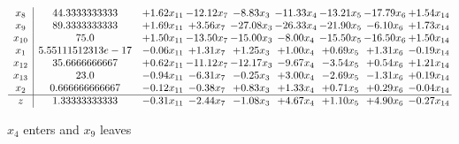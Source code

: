 \documentclass[9pt]{article}
\begin{document}
 \[\begin{array}{c| c c@{\hskip 2pt} c@{\hskip 2pt} c@{\hskip 2pt} c@{\hskip 2pt} c@{\hskip 2pt} c@{\hskip 2pt} c@{\hskip 2pt} }
 x_{8}   &  44.3333333333 & +  1.62 x_{11} & -12.12 x_{7} & -8.83 x_{3} & -11.33 x_{4} & -13.21 x_{5} & -17.79 x_{6} & +  1.54 x_{14}\\
 x_{9}   &  89.3333333333 & +  1.69 x_{11} & +  3.56 x_{7} & -27.08 x_{3} & -26.33 x_{4} & -21.90 x_{5} & -6.10 x_{6} & +  1.73 x_{14}\\
 x_{10}   &  75.0 & +  1.50 x_{11} & -13.50 x_{7} & -15.00 x_{3} & -8.00 x_{4} & -15.50 x_{5} & -16.50 x_{6} & +  1.50 x_{14}\\
 x_{1}   &  5.55111512313e-17 & -0.06 x_{11} & +  1.31 x_{7} & +  1.25 x_{3} & +  1.00 x_{4} & +  0.69 x_{5} & +  1.31 x_{6} & -0.19 x_{14}\\
 x_{12}   &  35.6666666667 & +  0.62 x_{11} & -11.12 x_{7} & -12.17 x_{3} & -9.67 x_{4} & -3.54 x_{5} & +  0.54 x_{6} & +  1.21 x_{14}\\
 x_{13}   &  23.0 & -0.94 x_{11} & -6.31 x_{7} & -0.25 x_{3} & +  3.00 x_{4} & -2.69 x_{5} & -1.31 x_{6} & +  0.19 x_{14}\\
 x_{2}   &  0.666666666667 & -0.12 x_{11} & -0.38 x_{7} & +  0.83 x_{3} & +  1.33 x_{4} & +  0.71 x_{5} & +  0.29 x_{6} & -0.04 x_{14}\\
\hline
z    &  1.33333333333 & -0.31 x_{11} & -2.44 x_{7} & -1.08 x_{3} & +  4.67 x_{4} & +  1.10 x_{5} & +  4.90 x_{6} & -0.27 x_{14}\\
\end{array}\]


 $ x_{4} $ enters and $ x_{9} $ leaves 
\end{document}
